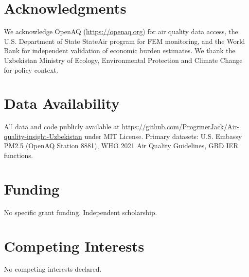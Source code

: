 \documentclass[11pt,a4paper]{article}
\begin{document}
\section*{Acknowledgments}

We acknowledge OpenAQ (\url{https://openaq.org}) for air quality data access, the U.S. Department of State StateAir program for FEM monitoring, and the World Bank for independent validation of economic burden estimates. We thank the Uzbekistan Ministry of Ecology, Environmental Protection and Climate Change for policy context.

\section*{Data Availability}

All data and code publicly available at \url{https://github.com/ProgrmerJack/Air-quality-insight-Uzbekistan} under MIT License. Primary datasets: U.S. Embassy PM2.5 (OpenAQ Station 8881), WHO 2021 Air Quality Guidelines, GBD IER functions.

\section*{Funding}

No specific grant funding. Independent scholarship.

\section*{Competing Interests}

No competing interests declared.
\end{document}
